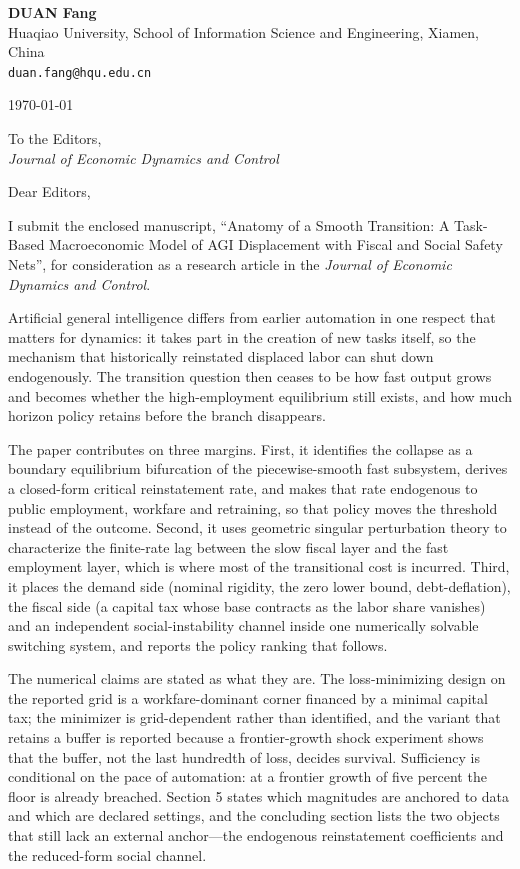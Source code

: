 \documentclass[11pt]{article}
\begin{document}
\textbf{DUAN Fang}\\
Huaqiao University, School of Information Science and Engineering, Xiamen, China\\
\texttt{duan.fang@hqu.edu.cn}

\vspace{6pt}
\today

\vspace{10pt}
To the Editors,\\
\emph{Journal of Economic Dynamics and Control}

\vspace{6pt}
Dear Editors,

I submit the enclosed manuscript, ``Anatomy of a Smooth Transition: A Task-Based Macroeconomic Model of AGI Displacement with Fiscal and Social Safety Nets'', for consideration as a research article in the \emph{Journal of Economic Dynamics and Control}.

Artificial general intelligence differs from earlier automation in one respect that matters for dynamics: it takes part in the creation of new tasks itself, so the mechanism that historically reinstated displaced labor can shut down endogenously. The transition question then ceases to be how fast output grows and becomes whether the high-employment equilibrium still exists, and how much horizon policy retains before the branch disappears.

The paper contributes on three margins. First, it identifies the collapse as a boundary equilibrium bifurcation of the piecewise-smooth fast subsystem, derives a closed-form critical reinstatement rate, and makes that rate endogenous to public employment, workfare and retraining, so that policy moves the threshold instead of the outcome. Second, it uses geometric singular perturbation theory to characterize the finite-rate lag between the slow fiscal layer and the fast employment layer, which is where most of the transitional cost is incurred. Third, it places the demand side (nominal rigidity, the zero lower bound, debt-deflation), the fiscal side (a capital tax whose base contracts as the labor share vanishes) and an independent social-instability channel inside one numerically solvable switching system, and reports the policy ranking that follows.

The numerical claims are stated as what they are. The loss-minimizing design on the reported grid is a workfare-dominant corner financed by a minimal capital tax; the minimizer is grid-dependent rather than identified, and the variant that retains a buffer is reported because a frontier-growth shock experiment shows that the buffer, not the last hundredth of loss, decides survival. Sufficiency is conditional on the pace of automation: at a frontier growth of five percent the floor is already breached. Section 5 states which magnitudes are anchored to data and which are declared settings, and the concluding section lists the two objects that still lack an external anchor---the endogenous reinstatement coefficients and the reduced-form social channel.
\end{document}
